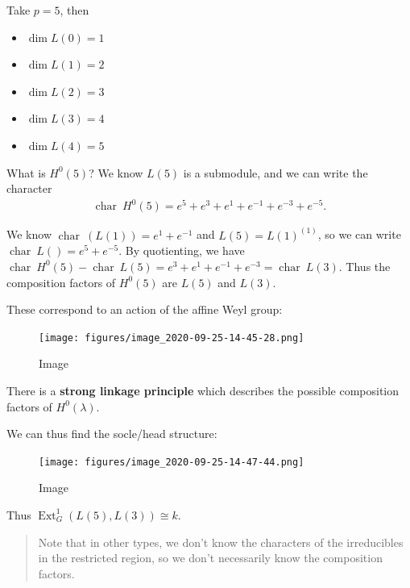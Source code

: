 \begin{example}
\begin{example}
Take \(p=5\), then

\begin{itemize}
\tightlist
\item
  \(\dim L(0) = 1\)
\item
  \(\dim L(1) = 2\)
\item
  \(\dim L(2) = 3\)
\item
  \(\dim L(3) = 4\)
\item
  \(\dim L(4) = 5\)
\end{itemize}

What is \(H^0(5)\)? We know \(L(5)\) is a submodule, and we can write
the character
\begin{align*}   \operatorname{char}~H^0(5) = e^5 + e^3 + e^1 + e^{-1} + e^{-3} + e^{-5} .\end{align*}

We know \(\operatorname{char}~(L(1)) = e^1 + e^{-1}\) and
\(L(5) = L(1)^{(1)}\), so we can write
\(\operatorname{char}~L() = e^{5} + e^{-5}\). By quotienting, we have
\(\operatorname{char}~H^0(5) - \operatorname{char}~L(5) = e^3 + e^1 + e^{-1} +e^{-3} = \operatorname{char}~L(3)\).
Thus the composition factors of \(H^0(5)\) are \(L(5)\) and \(L(3)\).

These correspond to an action of the affine Weyl group:

\begin{figure}
\centering
\texttt{[image: figures/image\_2020-09-25-14-45-28.png]}
\caption{Image}
\end{figure}

There is a \textbf{strong linkage principle} which describes the
possible composition factors of \(H^0(\lambda)\).

We can thus find the socle/head structure:

\begin{figure}
\centering
\texttt{[image: figures/image\_2020-09-25-14-47-44.png]}
\caption{Image}
\end{figure}

Thus \(\operatorname{Ext}_G^1(L(5), L(3)) \cong k\).

\end{example}

\end{example}

\begin{quote}
Note that in other types, we don't know the characters of the
irreducibles in the restricted region, so we don't necessarily know the
composition factors.
\end{quote}


